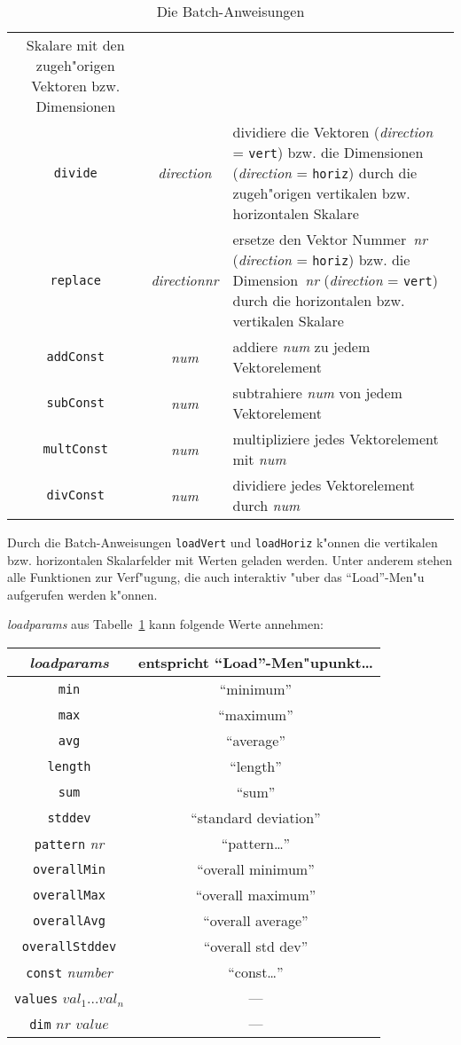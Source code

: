 \begin{table}
\begin{tabular}{c|c|p{7.5cm}}
Skalare mit den zugeh"origen Vektoren bzw. Dimensionen \\
{\tt divide} & {\it direction} & dividiere die Vektoren 
({\it direction} = {\tt vert})
bzw. die Dimensionen ({\it direction} = {\tt horiz}) durch die zugeh"origen 
vertikalen bzw. horizontalen Skalare \\
{\tt replace} & {\it direction\quad nr} & ersetze den Vektor Nummer~{\it nr} 
({\it direction} = {\tt horiz}) bzw. die Dimension~{\it nr} 
({\it direction} = {\tt vert}) durch die horizontalen 
bzw. vertikalen Skalare \\
{\tt addConst} & {\it num} & addiere {\it num} zu jedem Vektorelement \\
{\tt subConst} & {\it num} & subtrahiere {\it num} von jedem Vektorelement \\
{\tt multConst} & {\it num} & multipliziere jedes Vektorelement mit 
{\it num} \\
{\tt divConst} & {\it num} & dividiere jedes Vektorelement durch {\it num} \\ 
\end{tabular}
\caption{\label{batchcommands} Die Batch-Anweisungen}
\end{table}
  
Durch die Batch-Anweisungen {\tt loadVert} und {\tt loadHoriz} k"onnen
die vertikalen bzw. horizontalen Skalarfelder mit Werten geladen werden.
Unter anderem stehen alle Funktionen zur Verf"ugung, die auch interaktiv "uber
das "`Load"'-Men"u aufgerufen werden k"onnen. 

{\it loadparams} aus Tabelle~\ref{batchcommands} kann folgende Werte
annehmen: 

\nopagebreak
\begin{tabular}{c|c}
{\it loadparams} & {\bf entspricht "`Load"'-Men"upunkt\ldots} \\ \hline
{\tt min} & "`minimum"' \\
{\tt max} & "`maximum"' \\
{\tt avg} & "`average"' \\
{\tt length} & "`length"' \\
{\tt sum} & "`sum"' \\
{\tt stddev} & "`standard deviation"' \\
{\tt pattern} {\it nr} & "`pattern\ldots"' \\
{\tt overallMin} & "`overall minimum"' \\
{\tt overallMax} & "`overall maximum"' \\
{\tt overallAvg} & "`overall average"' \\
{\tt overallStddev} & "`overall std dev"' \\
{\tt const} {\it number} & "`const\ldots"' \\
{\tt values} $val_1 \ldots val_n$ & --- \\
{\tt dim} \enspace $nr$ \enspace $value$ & --- \\  
\end{tabular} 

